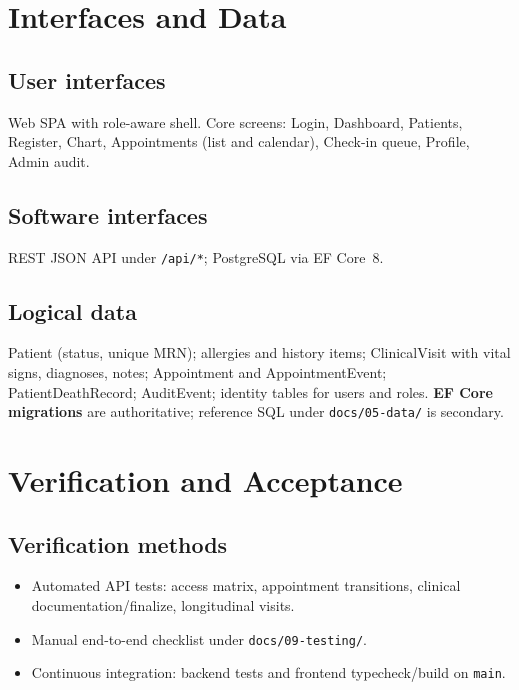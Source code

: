 \documentclass[11pt,a4paper]{article}
\begin{document}
\section{Interfaces and Data}

\subsection{User interfaces}
Web SPA with role-aware shell. Core screens: Login, Dashboard, Patients, Register, Chart, Appointments (list and calendar), Check-in queue, Profile, Admin audit.

\subsection{Software interfaces}
REST JSON API under \texttt{/api/*}; PostgreSQL via EF Core~8.

\subsection{Logical data}
Patient (status, unique MRN); allergies and history items; ClinicalVisit with vital signs, diagnoses, notes; Appointment and AppointmentEvent; PatientDeathRecord; AuditEvent; identity tables for users and roles. \textbf{EF Core migrations} are authoritative; reference SQL under \texttt{docs/05-data/} is secondary.

\section{Verification and Acceptance}

\subsection{Verification methods}
\begin{itemize}
  \item Automated API tests: access matrix, appointment transitions, clinical documentation/finalize, longitudinal visits.
  \item Manual end-to-end checklist under \texttt{docs/09-testing/}.
  \item Continuous integration: backend tests and frontend typecheck/build on \texttt{main}.
\end{itemize}
\end{document}
